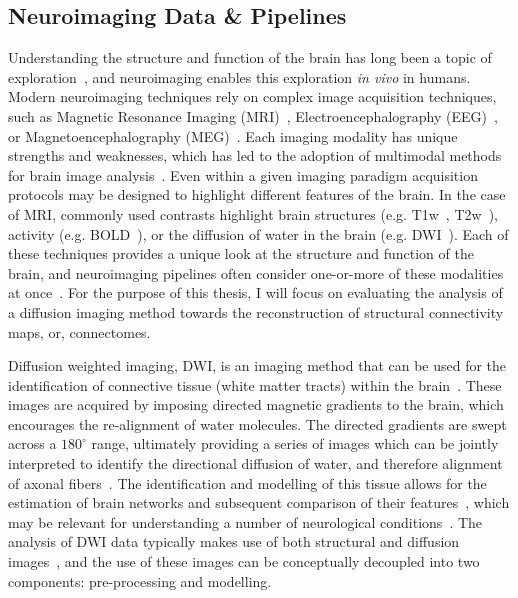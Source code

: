 \subsection{Neuroimaging Data \& Pipelines}
Understanding the structure and function of the brain has long been a topic of exploration~\cite{raichle2006brain}, and
neuroimaging enables this exploration \textit{in vivo} in humans. Modern neuroimaging techniques rely on complex image
acquisition techniques, such as Magnetic Resonance Imaging (MRI)~\cite{young1987magnetic}, Electroencephalography
(EEG)~\cite{da2009eeg}, or Magnetoencephalography (MEG)~\cite{baillet2017magnetoencephalography}. Each imaging modality
has unique strengths and weaknesses, which has led to the adoption of multimodal methods for brain image
analysis~\cite{sui2012review,calhoun2006feature}. Even within a given imaging paradigm acquisition protocols may be
designed to highlight different features of the brain. In the case of MRI, commonly used contrasts highlight brain
structures (e.g. T1w~\cite{bergamino2014review}, T2w~\cite{chavhan2009principles}), activity (e.g.
BOLD~\cite{logothetis2004nature}), or the diffusion of water in the brain (e.g. DWI~\cite{bammer2003basic}). Each of
these techniques provides a unique look at the structure and function of the brain, and neuroimaging pipelines often
consider one-or-more of these modalities at once~\cite{esteban2019fmriprep,garyfallidis2014dipy}. For the purpose of
this thesis, I will focus on evaluating the analysis of a diffusion imaging method towards the reconstruction of
structural connectivity maps, or, connectomes.

Diffusion weighted imaging, DWI, is an imaging method that can be used for the identification of connective tissue
(white matter tracts) within the brain~\cite{wandell2016clarifying,thomason2011diffusion}. These images are acquired by
imposing directed magnetic gradients to the brain, which encourages the re-alignment of water molecules. The directed
gradients are swept across a $180^{\circ}$ range, ultimately providing a series of images which can be jointly
interpreted to identify the directional diffusion of water, and therefore alignment of axonal
fibers~\cite{pinto2020harmonization}. The identification and modelling of this tissue allows for the estimation of
brain networks and subsequent comparison of their features~\cite{sporns2013human}, which may be relevant for
understanding a number of neurological
conditions~\cite{shah2017altered,yan2018rich,xie2012mapping,griffa2013structural}. The analysis of DWI data typically
makes use of both structural and diffusion images~\cite{jenkinson2012fsl,garyfallidis2014dipy}, and the use of these
images can be conceptually decoupled into two components: pre-processing and modelling.

